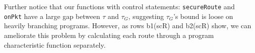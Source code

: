 
Further notice that our functions with control statements: \texttt{secureRoute} and \texttt{onPkt} have a large gap between $\tau$ and $\tau_G$, suggesting $\tau_G$'s bound is loose on heavily branching programs. However, as rows b1(scR) and b2(scR) show, we can ameliorate this problem  by calculating each route through a program characteristic function separately. 


